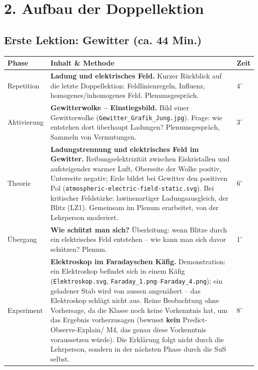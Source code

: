 \documentclass[11pt,a4paper]{article}
\begin{document}
\section*{2. Aufbau der Doppellektion}

\subsection*{Erste Lektion: Gewitter (ca. 44 Min.)}

\begin{xltabular}{\textwidth}{@{}p{2.6cm}X p{1.2cm}@{}}
\toprule
\textbf{Phase} & \textbf{Inhalt \& Methode} & \textbf{Zeit} \\
\midrule
\endhead

Repetition &
\textbf{Ladung und elektrisches Feld.} Kurzer Rückblick auf die letzte
Doppellektion: Feldlinienregeln, Influenz, homogenes/inhomogenes Feld.
Plenumsgespräch. &
4' \\[0.4em]

Aktivierung &
\textbf{Gewitterwolke -- Einstiegsbild.} Bild einer Gewitterwolke
(\texttt{Gewitter\_Grafik\_Jung.jpg}). Frage: wie entstehen dort
überhaupt Ladungen? Plenumsgespräch, Sammeln von Vermutungen. &
3' \\[0.4em]

Theorie &
\textbf{Ladungstrennung und elektrisches Feld im Gewitter.}
Reibungselektrizität zwischen Eiskristallen und aufsteigender warmer
Luft, Oberseite der Wolke positiv, Unterseite negativ; Erde bildet bei
Gewitter den positiven Pol (\texttt{atmospheric-electric-field-static.svg}).
Bei kritischer Feldstärke: lawinenartiger Ladungsausgleich, der Blitz
(LZ1). Gemeinsam im Plenum erarbeitet, von der Lehrperson moderiert. &
6' \\[0.4em]

Übergang &
\textbf{Wie schützt man sich?} Überleitung: wenn Blitze durch ein
elektrisches Feld entstehen -- wie kann man sich davor schützen? Plenum. &
1' \\[0.4em]

Experiment &
\textbf{Elektroskop im Faradayschen Käfig.} Demonstration: ein Elektroskop
befindet sich in einem Käfig (\texttt{Elektroskop.svg},
\texttt{Faraday\_1.png}--\texttt{Faraday\_4.png}); ein geladener Stab wird
von aussen angenähert -- das Elektroskop schlägt nicht aus. Reine
Beobachtung ohne Vorhersage, da die Klasse noch keine Vorkenntnis hat, um
das Ergebnis vorherzusagen (bewusst \textbf{kein} Predict-Observe-Explain/
M4, das genau diese Vorkenntnis voraussetzen würde). Die Erklärung folgt
nicht durch die Lehrperson, sondern in der nächsten Phase durch die SuS
selbst. &
8' \\[0.4em]


\end{xltabular}
\end{document}
